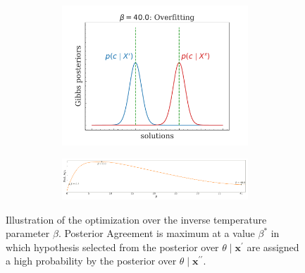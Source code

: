 \begin{frame}
\begin{figure}[H]
\begin{subfigure}[b]{0.9\textwidth}
\begin{subfigure}[b]{0.3\textwidth}
				\centering
				\includegraphics[width=\textwidth]{img/theoretical_background/method_beta=40.0.pdf}
			\end{subfigure}
		
			\vspace{1em}
		
			\begin{subfigure}[b]{0.975\textwidth}
				\hspace{0.05cm}
				\includegraphics[width=\textwidth]{img/theoretical_background/gibbs_betas.pdf}
			\end{subfigure}
		\end{subfigure}
		
		\caption{
			Illustration of the optimization over the inverse temperature parameter $\beta$. 
			Posterior Agreement is maximum at a value $\beta^{*}$ 
			in which hypothesis selected from the posterior over $\theta \mid \bm{x^\prime}$ are assigned
			a high probability by the posterior over $\theta \mid \bm{x^{\prime\prime}}$.
		}
	\end{figure}
\end{frame}


\begin{frame}
    \centering
    \Huge{\insertsection}  %
\end{frame}

